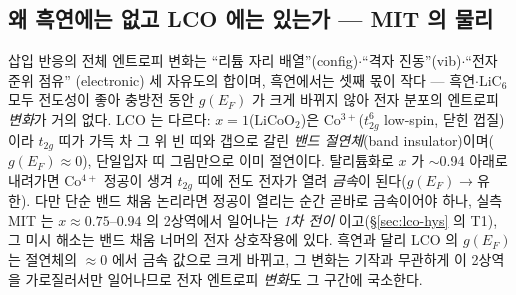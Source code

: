 \subsection{왜 흑연에는 없고 LCO 에는 있는가 --- MIT 의 물리}\label{sec:lco-why}
삽입 반응의 전체 엔트로피 변화는 ``리튬 자리 배열''(config)$\cdot$``격자 진동''(vib)$\cdot$``전자 준위 점유''
(electronic) 세 자유도의 합이며, 흑연에서는 셋째 몫이 작다 --- 흑연$\cdot$$\mathrm{LiC_6}$ 모두 전도성이 좋아
충방전 동안 $g(E_F)$ 가 크게 바뀌지 않아 전자 분포의 엔트로피 \emph{변화}가 거의 없다. LCO 는 다르다:
$x{=}1$($\mathrm{LiCoO_2}$)은 Co$^{3+}$($t_{2g}^6$ low-spin, 닫힌 껍질)이라 $t_{2g}$ 띠가 가득 차 그 위 빈
띠와 갭으로 갈린 \emph{밴드 절연체}(band insulator)이며($g(E_F)\!\approx\!0$), 단일입자 띠 그림만으로 이미
절연이다. 탈리튬화로 $x$ 가 $\sim$0.94 아래로 내려가면 Co$^{4+}$ 정공이 생겨 $t_{2g}$ 띠에 전도 전자가 열려
\emph{금속}이 된다($g(E_F)\!\to\!$유한)\cite{menetrier1999,motohashi2009}. 다만 단순 밴드 채움 논리라면 정공이
열리는 순간 곧바로 금속이어야 하나, 실측 MIT 는 $x\approx0.75$--$0.94$ 의 2상역에서 일어나는 \emph{1차 전이}
이고(\S\ref{sec:lco-hys} 의 T1), 그 미시 해소는 밴드 채움 너머의 전자 상호작용에 있다. 흑연과 달리 LCO 의
$g(E_F)$ 는 절연체의 $\approx0$ 에서 금속 값으로 크게 바뀌고, 그 변화는 기작과 무관하게 이 2상역을
가로질러서만 일어나므로 전자 엔트로피 \emph{변화}도 그 구간에 국소한다.

